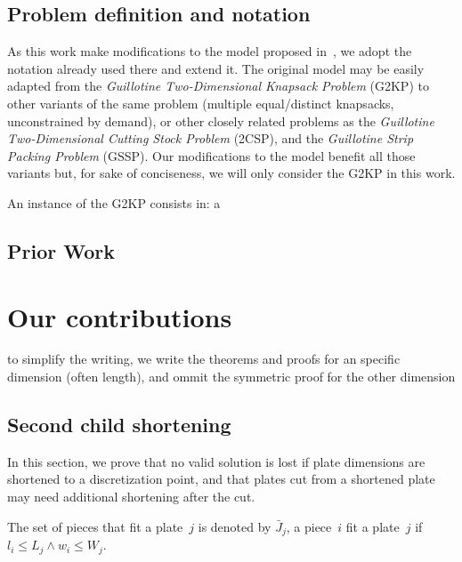 \documentclass[runningheads]{llncs}
\begin{document}
\subsection{Problem definition and notation}

As this work make modifications to the model proposed in~\cite{furini:2016},
we adopt the notation already used there and extend it.
The original model may be easily adapted from the \emph{Guillotine Two-Dimensional Knapsack Problem} (G2KP) to other variants of the same problem (multiple equal/distinct knapsacks, unconstrained by demand), or other closely related problems as the \emph{Guillotine Two-Dimensional Cutting Stock Problem} (2CSP), and the \emph{Guillotine Strip Packing Problem} (GSSP). Our modifications to the model benefit all those variants but, for sake of conciseness, we will only consider the G2KP in this work.

An instance of the G2KP consists in: a


\subsection{Prior Work}


\section{Our contributions}

to simplify the writing, we write the theorems and proofs for an specific dimension (often length), and ommit the symmetric proof for the other dimension

\subsection{Second child shortening}

In this section, we prove that no valid solution is lost if plate dimensions are shortened to a discretization point, and that plates cut from a shortened plate may need additional shortening after the cut.

\begin{definition}
The set of pieces that fit a plate~\(j\) is denoted by \(\bar{J}_j\), a piece~\(i\) fit a plate~\(j\) if \(l_i \leq L_j \land w_i \leq W_j\).
\end{definition}
\end{document}
